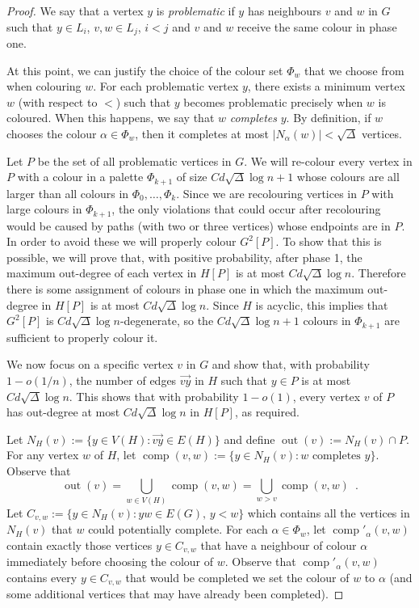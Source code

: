 \documentclass[kpfonts]{patmorin}
\newcommand{\defin}[1]{\emph{\color{brightmaroon}#1}}
\DeclareMathOperator{\outn}{out}
\DeclareMathOperator{\comp}{comp}
\begin{document}
\begin{proof}
  We say that a vertex $y$ is \defin{problematic} if $y$ has neighbours $v$ and $w$ in $G$ such that $y\in L_i$, $v,w\in L_j$, $i < j$ and $v$ and $w$ receive the same colour in phase one.

  At this point, we can justify the choice of the colour set $\Phi_w$ that we choose from when colouring $w$. For each problematic vertex $y$, there exists a minimum vertex $w$ (with respect to $<$) such that $y$ becomes problematic precisely when $w$ is coloured.  When this happens, we say that $w$ \defin{completes} $y$. By definition, if $w$ chooses the colour $\alpha\in\Phi_w$, then it completes at most $|N_{\alpha}(w)|<\sqrt{\Delta}$ vertices.

  Let $P$ be the set of all problematic vertices in $G$.  We will re-colour every vertex in $P$ with a colour in a palette $\Phi_{k+1}$ of size $Cd\sqrt{\Delta}\log n+1$ whose colours are all larger than all colours in $\Phi_0,\ldots,\Phi_k$.
  Since we are recolouring vertices in $P$ with large colours in $\Phi_{k+1}$, the only violations that could occur after recolouring would be caused by paths (with two or three vertices) whose endpoints are in $P$.  In order to avoid these we will properly colour $G^2[P]$.  To show that this is possible, we will prove that, with positive probability, after phase 1, the maximum out-degree of each vertex in $H[P]$ is at most $Cd\sqrt{\Delta}\log n$.  Therefore there is some assignment of colours in phase one in which the maximum out-degree in $H[P]$ is at most $Cd\sqrt{\Delta}\log n$.  Since $H$ is acyclic, this implies that $G^2[P]$ is $Cd\sqrt{\Delta}\log n$-degenerate, so the $Cd\sqrt{\Delta}\log n+1$ colours in $\Phi_{k+1}$ are sufficient to properly colour it.

  We now focus on a specific vertex $v$ in $G$ and show that, with probability $1-o(1/n)$, the number of edges $\overrightarrow{vy}$ in $H$ such that $y\in P$ is at most $Cd\sqrt{\Delta}\log n$.  This shows that with probability $1-o(1)$, every vertex $v$ of $P$ has out-degree at most $Cd\sqrt{\Delta}\log n$ in $H[P]$, as required.

  Let $N_H(v):=\{y\in V(H): \overrightarrow{vy}\in E(H)\}$ and define $\outn(v):=N_H(v)\cap P$. For any vertex $w$ of $H$, let $\comp(v,w):=\{y\in N_H(v):\text{$w$ completes $y$}\}$.  Observe that
  \[
    \outn(v) = \bigcup_{w\in V(H)} \comp(v,w) = \bigcup_{w>v} \comp(v,w) \enspace .
  \]
  Let $C_{v,w}:=\{y\in N_H(v): yw\in E(G),\, y < w\}$ which contains all the vertices in $N_H(v)$ that $w$ could potentially complete.  For each $\alpha\in\Phi_w$, let $\comp'_\alpha(v,w)$ contain exactly those vertices $y\in C_{v,w}$ that have a neighbour of colour $\alpha$ immediately before choosing the colour of $w$.  Observe that $\comp'_\alpha(v,w)$ contains every $y\in C_{v,w}$ that would be completed we set the colour of $w$ to $\alpha$ (and some additional vertices that may have already been completed).


\end{proof}
\end{document}
